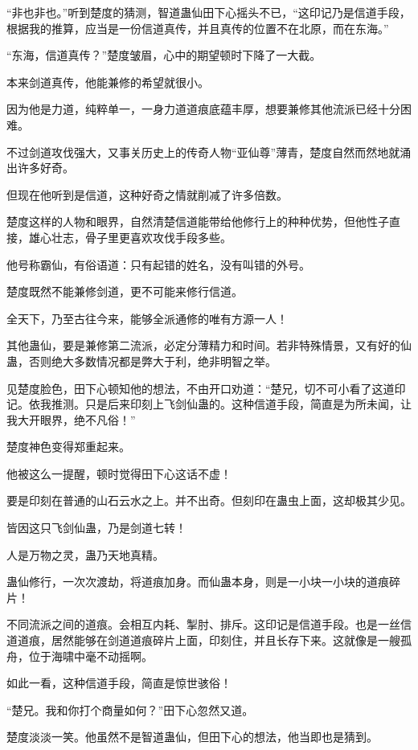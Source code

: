 
\begin{this_body}

“非也非也。”听到楚度的猜测，智道蛊仙田下心摇头不已，“这印记乃是信道手段，根据我的推算，应当是一份信道真传，并且真传的位置不在北原，而在东海。”

“东海，信道真传？”楚度皱眉，心中的期望顿时下降了一大截。

本来剑道真传，他能兼修的希望就很小。

因为他是力道，纯粹单一，一身力道道痕底蕴丰厚，想要兼修其他流派已经十分困难。

不过剑道攻伐强大，又事关历史上的传奇人物“亚仙尊”薄青，楚度自然而然地就涌出许多好奇。

但现在他听到是信道，这种好奇之情就削减了许多倍数。

楚度这样的人物和眼界，自然清楚信道能带给他修行上的种种优势，但他性子直接，雄心壮志，骨子里更喜欢攻伐手段多些。

他号称霸仙，有俗语道：只有起错的姓名，没有叫错的外号。

楚度既然不能兼修剑道，更不可能来修行信道。

全天下，乃至古往今来，能够全派通修的唯有方源一人！

其他蛊仙，要是兼修第二流派，必定分薄精力和时间。若非特殊情景，又有好的仙蛊，否则绝大多数情况都是弊大于利，绝非明智之举。

见楚度脸色，田下心顿知他的想法，不由开口劝道：“楚兄，切不可小看了这道印记。依我推测。只是后来印刻上飞剑仙蛊的。这种信道手段，简直是为所未闻，让我大开眼界，绝不凡俗！”

楚度神色变得郑重起来。

他被这么一提醒，顿时觉得田下心这话不虚！

要是印刻在普通的山石云水之上。并不出奇。但刻印在蛊虫上面，这却极其少见。

皆因这只飞剑仙蛊，乃是剑道七转！

人是万物之灵，蛊乃天地真精。

蛊仙修行，一次次渡劫，将道痕加身。而仙蛊本身，则是一小块一小块的道痕碎片！

不同流派之间的道痕。会相互内耗、掣肘、排斥。这印记是信道手段。也是一丝信道道痕，居然能够在剑道道痕碎片上面，印刻住，并且长存下来。这就像是一艘孤舟，位于海啸中毫不动摇啊。

如此一看，这种信道手段，简直是惊世骇俗！

“楚兄。我和你打个商量如何？”田下心忽然又道。

楚度淡淡一笑。他虽然不是智道蛊仙，但田下心的想法，他当即也是猜到。


\end{this_body}
